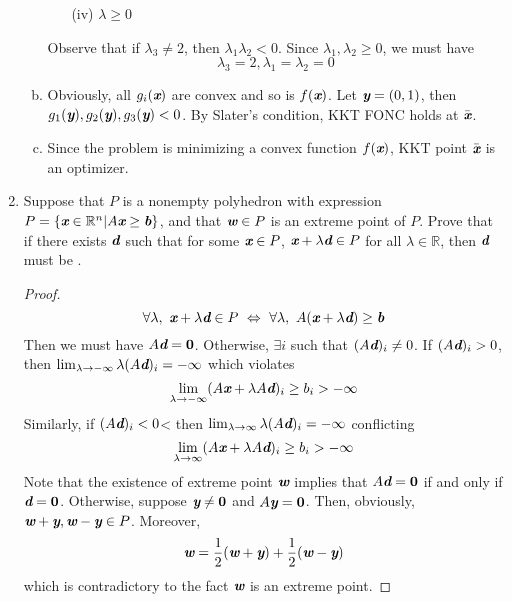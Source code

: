 \begin{enumerate}
\begin{enumerate}[(a)]
\begin{enumerate}[(i)]
			\item[(iv)] $\lambda\ge 0$
		\end{enumerate}
		Observe that if $\lambda_3 \neq 2$, then $\lambda_1\lambda_2 < 0$. Since $\lambda_1,\lambda_2\ge 0$, we must have $$\lambda_3 = 2, \lambda_1 = \lambda_2 = 0$$ 
		
		\item Obviously, all $g_i(\textit{\textbf{x}})$ are convex and so is $f(\textit{\textbf{x}})$. Let $\textit{\textbf{y}} = (0,1)$, then $g_1(\textit{\textbf{y}}), g_2(\textit{\textbf{y}}), g_3(\textit{\textbf{y}})<0$. By Slater's condition, KKT FONC holds at $\bar{\textit{\textbf{x}}}$.
		
		\item Since the problem is minimizing a convex function $f(\textit{\textbf{x}})$, KKT point $\bar{\textit{\textbf{x}}}$ is an optimizer.
	\end{enumerate}
	
	\newpage 
	\item Suppose that $P$ is a nonempty polyhedron with expression $P = \{\textit{\textbf{x}} \in \mathbb{R}^n|A\textit{\textbf{x}} \ge \textit{\textbf{b}}\}$,
	and that $\textit{\textbf{w}} \in P$ is an extreme point of $P$. Prove that if there exists  $\textit{\textbf{d}}$ such that for
	some $\textit{\textbf{x}} \in P$, $\textit{\textbf{x}}+\lambda \textit{\textbf{d}} \in P$ for all $\lambda \in \mathbb{R}$, then $\textit{\textbf{d}}$ must be \bo.
	
	\begin{proof}
		\[
		\forall \lambda,~ \textit{\textbf{x}}+\lambda \textit{\textbf{d}} \in P ~\Leftrightarrow~ \forall \lambda, ~A(\textit{\textbf{x}}+\lambda \textit{\textbf{d}}) \ge \textit{\textbf{b}}
		\]
		Then we must have $A\textit{\textbf{d}} = \textbf{0}$. Otherwise, $\exists i $ such that $(A\textit{\textbf{d}})_i \neq 0$. If $(A\textit{\textbf{d}})_i > 0$, then $\lim_{\lambda \rightarrow -\infty} \lambda(A\textit{\textbf{d}})_i = -\infty$ which violates $$\lim_{\lambda \rightarrow -\infty}(A\textit{\textbf{x}}+\lambda A\textit{\textbf{d}})_i \ge b_i > -\infty$$ Similarly, if $(A\textit{\textbf{d}})_i<0$< then $\lim_{\lambda \rightarrow \infty}\lambda(A\textit{\textbf{d}})_i =-\infty$ conflicting 
		$$\lim_{\lambda \rightarrow \infty}(A\textit{\textbf{x}}+\lambda A\textit{\textbf{d}})_i \ge b_i > -\infty$$ 
		Note that the existence of extreme point $\textit{\textbf{w}}$ implies that $A\textit{\textbf{d}} = \textbf{0}$ if and only if $\textit{\textbf{d}} =\textbf{0}$. Otherwise, suppose $\textit{\textbf{y}} \neq \textbf{0}$ and $A\textit{\textbf{y}} = \textbf{0}$. Then, obviously, $\textit{\textbf{w}}+\textit{\textbf{y}}, \textit{\textbf{w}} -\textit{\textbf{y}}\in P$. Moreover,
		\[
         \textit{\textbf{w}} = \frac{1}{2}(\textit{\textbf{w}}+\textit{\textbf{y}}) + \frac{1}{2}(\textit{\textbf{w}} -\textit{\textbf{y}})
		\]
		which is contradictory to the fact $\textit{\textbf{w}}$ is an extreme point.
		 
	\end{proof}


\end{enumerate}
